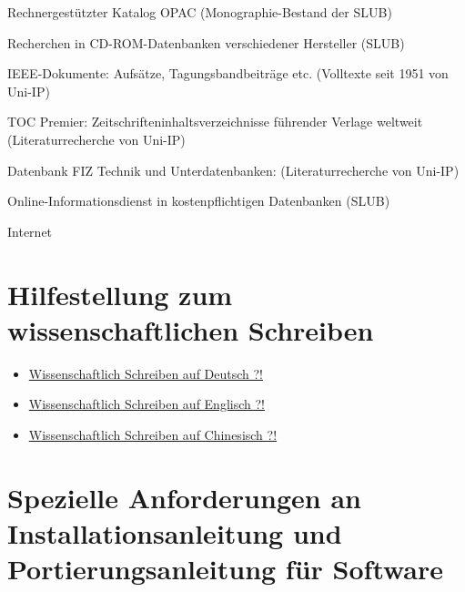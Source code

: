 \begin{compactitem}
  \item Rechnergestützter Katalog OPAC (Monographie-Bestand der SLUB)
  \item Recherchen in CD-ROM-Datenbanken verschiedener Hersteller (SLUB)
  \item IEEE-Dokumente: Aufsätze, Tagungsbandbeiträge etc. (Volltexte seit 1951 von Uni-IP)
  \item TOC Premier: Zeitschrifteninhaltsverzeichnisse führender Verlage weltweit (Literaturrecherche von Uni-IP)
  \item Datenbank FIZ Technik und Unterdatenbanken: (Literaturrecherche von Uni-IP)
  \item Online-Informationsdienst in kostenpflichtigen Datenbanken (SLUB)
  \item Internet
\end{compactitem}

\section{Hilfestellung zum wissenschaftlichen Schreiben}
\label{sec:HilfestellungZumwissenschaftlichenSchreiben}

\begin{itemize}
  \item \href{http://www.et.tu-dresden.de/ifa/fileadmin/user_upload/www_files/richtlinien_sa_da/Flyer_Wiss_Schreiben_Deutsch.pdf}{Wissenschaftlich Schreiben auf Deutsch ?!}
  \item \href{http://www.et.tu-dresden.de/ifa/fileadmin/user_upload/www_files/richtlinien_sa_da/Flyer_Wiss_Schreiben_Englisch.pdf}{Wissenschaftlich Schreiben auf Englisch ?!}
  \item \href{http://www.et.tu-dresden.de/ifa/fileadmin/user_upload/www_files/richtlinien_sa_da/Flyer_Wiss_Schreiben_Chinesisch.pdf}{Wissenschaftlich Schreiben auf Chinesisch ?!}
\end{itemize}

\section[Installations- und Portierungsanleitung]{Spezielle Anforderungen an Installationsanleitung und Portierungsanleitung für Software}
\label{sec:SpezielleAnforderungenAnInstallationsanleitungUndPortierungsanleitungFuerSoftware}

